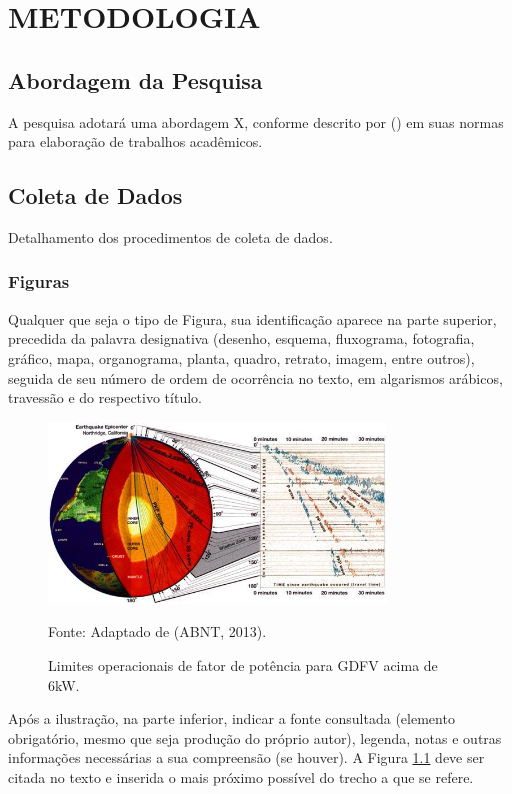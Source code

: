 \chapter{METODOLOGIA}
\section{Abordagem da Pesquisa}
A pesquisa adotará uma abordagem X, conforme descrito por \citeauthor{ufpr2009} (\citeyear{ufpr2009}) em suas normas para elaboração de trabalhos acadêmicos. 

\section{Coleta de Dados}
Detalhamento dos procedimentos de coleta de dados.

\subsection{Figuras}
Qualquer que seja o tipo de Figura, sua identificação aparece na parte superior, precedida da palavra designativa (desenho, esquema, fluxograma, fotografia, gráfico, mapa, organograma, planta, quadro, retrato, imagem, entre outros), seguida de seu número de ordem de ocorrência no texto, em algarismos arábicos, travessão e do respectivo título. 

\begin{figure}[H]
    \centering
    \includegraphics[width=0.8\textwidth]{figs/example-figure.png} %
    \caption{Limites operacionais de fator de potência para GDFV acima de 6kW. }
    \label{fig:limites_operacionais}
    \footnotesize
    Fonte: Adaptado de (ABNT, 2013). 
\end{figure}
Após a ilustração, na parte inferior, indicar a fonte consultada (elemento obrigatório, mesmo que seja produção do próprio autor), legenda, notas e outras informações necessárias a sua compreensão (se houver).  A Figura \ref{fig:limites_operacionais} deve ser citada no texto e inserida o mais próximo possível do trecho a que se refere. 

